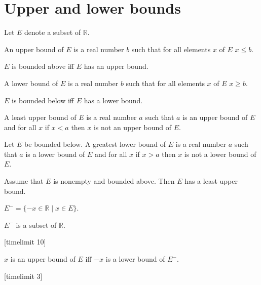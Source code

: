 \documentclass{article}
\begin{document}
\section{Upper and lower bounds}

\begin{forthel}

Let $E$ denote a subset of $\mathbb{R}$.

\begin{definition}[1 7]
An upper bound of $E$ is a
real number $b$ such that for all elements $x$ of $E$ $x \leq b$.
\end{definition}

\begin{definition}[1 7a]
$E$ is bounded above iff
$E$ has an upper bound.
\end{definition}

\begin{definition}[1 7b]
A lower bound of $E$ is a
real number $b$ such that for all elements $x$ of $E$ $x \geq b$.
\end{definition}

\begin{definition}[1 7c]
$E$ is bounded below iff
$E$ has a lower bound.
\end{definition}

\begin{definition}[1 8]
A least upper bound of $E$ is a real number $a$ such that
$a$ is an upper bound of $E$ and for all $x$ if $x < a$ then $x$
is not an upper bound of $E$.
\end{definition}

\begin{definition}[1 8a]
Let $E$ be bounded below.
A greatest lower bound of $E$ is a real number $a$ such that
$a$ is a lower bound of $E$ and for all $x$ if $x > a$ then $x$ is
not a lower bound of $E$.
\end{definition}

\begin{axiom}[1 19]
Assume that $E$ is nonempty and bounded above.
Then $E$ has a least upper bound.
\end{axiom}

\begin{definition}
$E^- = \{-x \in \mathbb{R} \mid x \in E\}$.
\end{definition}

\begin{lemma}
$E^-$ is a subset of $\mathbb{R}$.
\end{lemma}
[timelimit 10]
\begin{lemma}
$x$ is an upper bound of $E$ iff $-x$ is a lower bound of $E^-$.
\end{lemma}
[timelimit 3]


\end{forthel}
\end{document}
